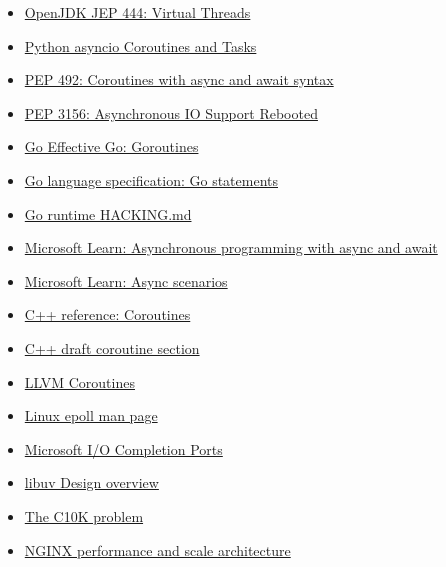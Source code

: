 \documentclass[
  11pt,
  a4paper,
]{article}
\providecommand{\tightlist}{%
  \setlength{\itemsep}{0pt}\setlength{\parskip}{0pt}}
\begin{document}
\begin{itemize}
\tightlist
\item
  \href{https://openjdk.org/jeps/444}{OpenJDK JEP 444: Virtual Threads}
\item
  \href{https://docs.python.org/3/library/asyncio-task.html}{Python
  asyncio Coroutines and Tasks}
\item
  \href{https://peps.python.org/pep-0492/}{PEP 492: Coroutines with
  async and await syntax}
\item
  \href{https://peps.python.org/pep-3156/}{PEP 3156: Asynchronous IO
  Support Rebooted}
\item
  \href{https://go.dev/doc/effective_go\#goroutines}{Go Effective Go:
  Goroutines}
\item
  \href{https://go.dev/ref/spec\#Go_statements}{Go language
  specification: Go statements}
\item
  \href{https://go.dev/src/runtime/HACKING.md}{Go runtime HACKING.md}
\item
  \href{https://learn.microsoft.com/en-us/dotnet/csharp/asynchronous-programming/}{Microsoft
  Learn: Asynchronous programming with async and await}
\item
  \href{https://learn.microsoft.com/en-us/dotnet/csharp/asynchronous-programming/async-scenarios}{Microsoft
  Learn: Async scenarios}
\item
  \href{https://en.cppreference.com/w/cpp/language/coroutines}{C++
  reference: Coroutines}
\item
  \href{https://eel.is/c++draft/dcl.fct.def.coroutine}{C++ draft
  coroutine section}
\item
  \href{https://llvm.org/docs/Coroutines.html}{LLVM Coroutines}
\item
  \href{https://man7.org/linux/man-pages/man7/epoll.7.html}{Linux epoll
  man page}
\item
  \href{https://learn.microsoft.com/en-us/windows/win32/fileio/i-o-completion-ports}{Microsoft
  I/O Completion Ports}
\item
  \href{https://docs.libuv.org/en/v1.x/design.html}{libuv Design
  overview}
\item
  \href{https://www.kegel.com/c10k.html}{The C10K problem}
\item
  \href{https://www.nginx.com/blog/inside-nginx-how-we-designed-for-performance-scale/}{NGINX
  performance and scale architecture}
\end{itemize}

\endgroup
\end{document}
